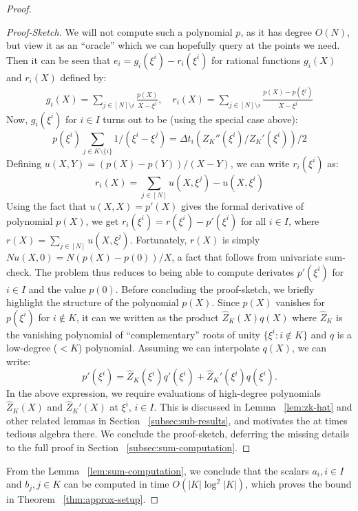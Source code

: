 \begin{proof}
\begin{proof}[Proof-Sketch]
        We will not compute such a polynomial $p$, as it has degree $O(N)$, but view it as an ``oracle'' which we can hopefully query at the points we need.
        Then it can be seen that $e_i=g_i(\xi^i) - r_i(\xi^i)$ for rational functions $g_i(X)$ and $r_i(X)$ defined by:
        \begin{align}\label{eq:rat-fun-f}
        g_i(X) =\sum_{j\in [N]\setminus i}\frac{p(X)}{X-\xi^j},\quad
        r_i(X) =\sum_{j\in [N]\setminus i} \frac{p(X)-p(\xi^j)}{X-\xi^j}
        \end{align}
        Now, $g_i(\xi^i)$ for $i\in I$ turns out to be (using the special case above):
        $$p(\xi^i)\sum_{j\in K\setminus \{i\}} 1/(\xi^i-\xi^j)=\Delta t_i (Z_K''(\xi^i)/Z_K'(\xi^i))/2$$
        Defining $u(X,Y)=(p(X)-p(Y))/(X-Y)$, we can write $r_i(\xi^i)$ as:
        \begin{equation}
            r_i(X) = \sum_{j\in [N]}u(X,\xi^j) - u(X,\xi^i)
        \end{equation}
        Using the fact that $u(X,X)=p'(X)$ gives the formal derivative of polynomial $p(X)$, we get
        $r_i(\xi^i)=r(\xi^i)-p'(\xi^i)$ for all $i\in I$, where $r(X)=\sum_{j\in [N]}u(X,\xi^j)$. Fortunately,
        $r(X)$ is simply $Nu(X,0)=N(p(X) - p(0))/X$, a fact that follows from univariate sum-check. The problem
        thus reduces to being able to compute derivates $p'(\xi^i)$ for $i\in I$ and the value $p(0)$. Before
        concluding the proof-sketch, we briefly highlight the structure of the polynomial $p(X)$. Since $p(X)$
        vanishes for $p(\xi^i)$ for $i\not\in K$, it can we written as the product $\widehat{Z}_K(X)q(X)$ where
        $\widehat{Z}_K$ is the vanishing polynomial of ``complementary'' roots of unity $\{\xi^i: i\not\in K\}$
        and $q$ is a low-degree ($<K$) polynomial. Assuming we can interpolate $q(X)$, we can write:
        \[ p'(\xi^i) = \widehat{Z}_K(\xi^i)q'(\xi^i) + \widehat{Z}_K'(\xi^i)q(\xi^i). \]
        In the above expression, we require evaluations of high-degree polynomials $\widehat{Z}_K(X)$ and $\widehat{Z}_K'(X)$
        at $\xi^i$, $i\in I$. This is discussed in Lemma ~\ref{lem:zk-hat} and other related lemmas in Section ~\ref{subsec:sub-results},
        and motivates the at times tedious algebra there. We conclude the proof-sketch, deferring the missing details to the full
        proof in Section ~\ref{subsec:sum-computation}.
    \end{proof}

    From the Lemma ~\ref{lem:sum-computation}, we conclude that the scalars $a_i,i\in I$ and $b_j, j\in K$ can be computed in
    time $O(|K|\log^2 |K|)$, which proves the bound in Theorem ~\ref{thm:approx-setup}.

\end{proof}

